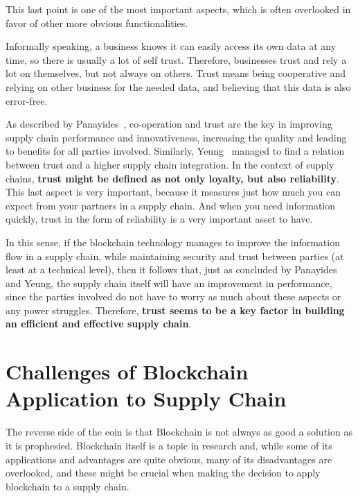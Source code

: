 
This last point is one of the most important aspects, which is often overlooked in favor of other more obvious functionalities.

Informally speaking, a business knows it can easily access its own data at any time, so there is usually a lot of self trust. Therefore, businesses trust and rely a lot on themselves, but not always on others. Trust means being cooperative and relying on other business for the needed data, and believing that this data is also error-free. 

As described by Panayides~\cite{Panayides2009}, co-operation and trust are the key in improving supply chain performance and innovativeness, increasing the quality and leading to benefits for all parties involved. Similarly, Yeung~\cite{Yeung2009} managed to find a relation between trust and a higher supply chain integration. In the context of supply chains, \textbf{trust might be defined as not only loyalty, but also reliability}. This last aspect is very important, because it measures just how much you can expect from your partners in a supply chain. And when you need information quickly, trust in the form of reliability is a very important asset to have.

In this sense, if the blockchain technology manages to improve the information flow in a supply chain, while maintaining security and trust between parties (at least at a technical level), then it follows that, just as concluded by Panayides and Yeung, the supply chain itself will have an improvement in performance, since the parties involved do not have to worry as much about these aspects or any power struggles. Therefore, \textbf{trust seems to be a key factor in building an efficient and effective supply chain}.

\section{Challenges of Blockchain Application to Supply Chain}

The reverse side of the coin is that Blockchain is not always as good a solution as it is prophesied. Blockchain itself is a topic in research and, while some of its applications and advantages are quite obvious, many of its disadvantages are overlooked, and these might be crucial when making the decision to apply blockchain to a supply chain.

